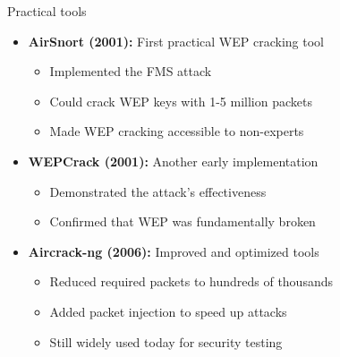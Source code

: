 \documentclass[aspectratio=169, lualatex, handout]{beamer}
\begin{document}
\begin{frame}{Practical tools}
	\begin{itemize}[<+->]
		\item \textbf{AirSnort (2001):} First practical WEP cracking tool
		      \begin{itemize}[<+->]
			      \item Implemented the FMS attack
			      \item Could crack WEP keys with 1-5 million packets
			      \item Made WEP cracking accessible to non-experts
		      \end{itemize}
		\item \textbf{WEPCrack (2001):} Another early implementation
		      \begin{itemize}[<+->]
			      \item Demonstrated the attack's effectiveness
			      \item Confirmed that WEP was fundamentally broken
		      \end{itemize}
		\item \textbf{Aircrack-ng (2006):} Improved and optimized tools
		      \begin{itemize}[<+->]
			      \item Reduced required packets to hundreds of thousands
			      \item Added packet injection to speed up attacks
			      \item Still widely used today for security testing
		      \end{itemize}
	\end{itemize}
\end{frame}
\end{document}
